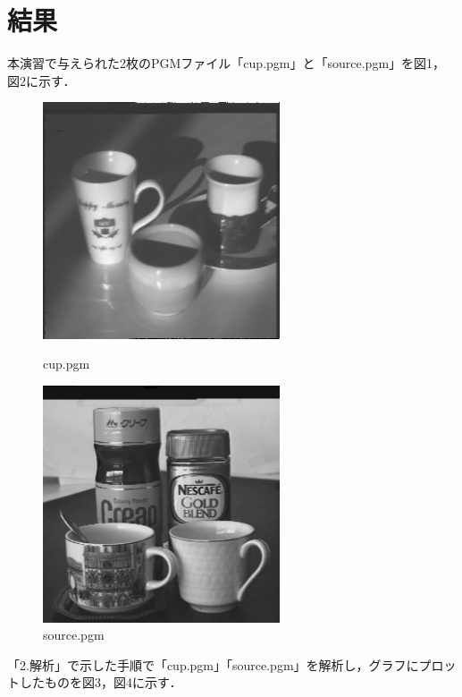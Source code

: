 \documentclass{jsarticle}
\begin{document}
\newpage

\section{結果}
本演習で与えられた2枚のPGMファイル「cup.pgm」と「source.pgm」を図1，図2に示す．
\begin{figure}[htbp]
 \begin{minipage}{0.5\hsize}
  \begin{center}
   \includegraphics[width=70mm]{cup.png}
  \end{center}
  \caption{cup.pgm}
  \label{fig:one}
 \end{minipage}
 \begin{minipage}{0.5\hsize}
  \begin{center}
   \includegraphics[width=70mm]{source.png}
  \end{center}
  \caption{source.pgm}
  \label{fig:two}
 \end{minipage}
\end{figure}

「2.解析」で示した手順で「cup.pgm」「source.pgm」を解析し，グラフにプロットしたものを図3，図4に示す．\\
\end{document}
